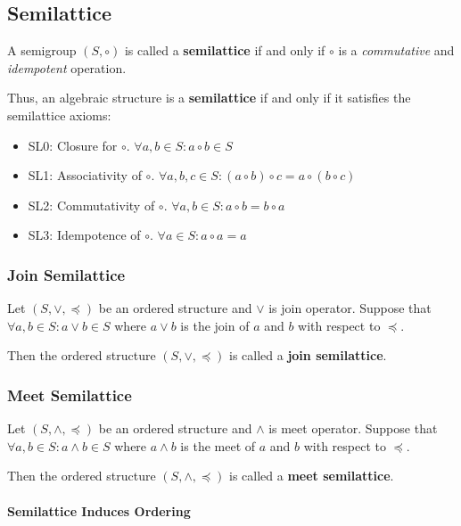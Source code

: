 \subsection{Semilattice}
\label{sec:semilattice}

A semigroup $(S, \circ)$ is called a \textbf{semilattice} if and only
if $\circ$ is a \textit{commutative} and \textit{idempotent}
operation.

Thus, an algebraic structure is a \textbf{semilattice} if and only if
it satisfies the semilattice axioms:

\begin{itemize}
\item SL0: Closure for $\circ$. $\forall a, b \in S: a \circ b \in S$
\item SL1: Associativity of $\circ$.
  $\forall a, b, c \in S: (a \circ b) \circ c = a \circ (b \circ c)$
\item SL2: Commutativity of $\circ$.
  $\forall a, b \in S: a \circ b = b \circ a$
\item SL3: Idempotence of $\circ$. $\forall a \in S: a \circ a = a$
\end{itemize}


\subsubsection{Join Semilattice}

Let $(S, \vee, \preceq)$ be an ordered structure and $\vee$ is join
operator. Suppose that $\forall a, b \in S: a \vee b \in S$ where
$a \vee b$ is the join of $a$ and $b$ with respect to $\preceq$.

Then the ordered structure $(S, \vee, \preceq)$ is called a
\textbf{join semilattice}.


\subsubsection{Meet Semilattice}

Let $(S, \wedge, \preceq)$ be an ordered structure and $\wedge$ is
meet operator. Suppose that $\forall a, b \in S: a \wedge b \in S$
where $a \wedge b$ is the meet of $a$ and $b$ with respect to
$\preceq$.

Then the ordered structure $(S, \wedge, \preceq)$ is called a
\textbf{meet semilattice}.


\paragraph{Semilattice Induces Ordering}
\label{sec:semilattice-induces-ordering}

